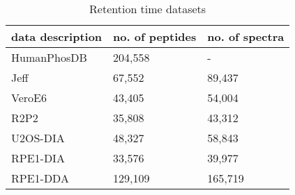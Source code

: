 %
%
%
%
%
%
%
%
%
%
%

\begin{table}
    \begin{center}
    \begin{tabularx}{\columnwidth}{|m{}|Y|Y|}
    \hline
    data description & no. of peptides & no. of spectra\\
    \hline
    HumanPhosDB~\cite{lawrence2016plug} & 204,558 & -\\
    Jeff~\cite{liu2018vivo} & 67,552 & 89,437\\
    VeroE6~\cite{bouhaddou2020global} & 43,405  & 54,004\\
    R2P2~\cite{leutert2019r2} & 35,808 & 43,312\\
    U2OS-DIA~\cite{wang2020naguider} & 48,327 & 58,843\\
    RPE1-DIA~\cite{bekker2020rapid} & 33,576 & 39,977\\
    RPE1-DDA~\cite{bekker2020rapid} & 129,109 & 165,719\\
    \hline
    \end{tabularx}
    \end{center}
    \caption{Retention time datasets}
    \label{table:Datasets}
    \end{table}
 
    \begin{table}
       \begin{center}
       \end{center}
       \caption{RT Dataset results. Ours is better in all three datasets. The left number in cell is $\Delta$$t_{95\%}$ where the lower is the better, and the right is PCC where the higher is the better.}
       \label{table:Jeff}
       \end{table}
 
